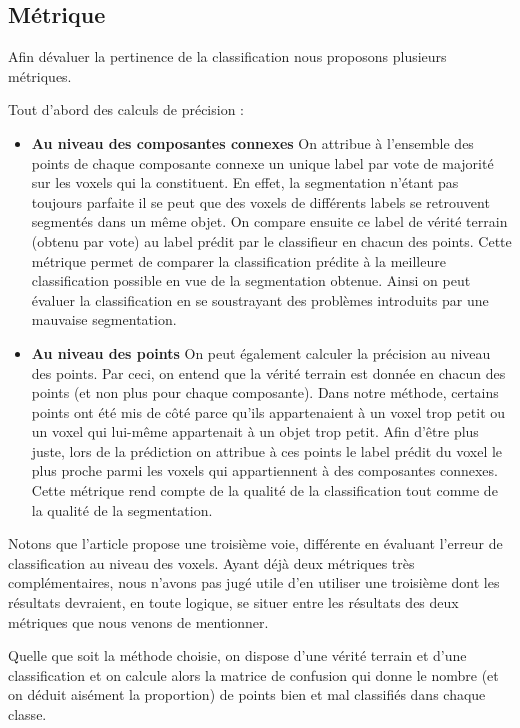 \documentclass[a4paper, onecolumn, 11pt]{article}
\begin{document}
\subsection{Métrique}

Afin dévaluer la pertinence de la classification nous proposons plusieurs métriques.

Tout d'abord des calculs de précision :
\begin{itemize}
\item \textbf{Au niveau des composantes connexes} On attribue à l'ensemble des points de chaque composante connexe un unique label par vote de majorité sur les voxels qui la constituent. En effet, la segmentation n'étant pas toujours parfaite il se peut que des voxels de différents labels se retrouvent segmentés dans un même objet. On compare ensuite ce label de vérité terrain (obtenu par vote) au label prédit par le classifieur en chacun des points. Cette métrique permet de comparer la classification prédite à la meilleure classification possible en vue de la segmentation obtenue. Ainsi on peut évaluer la classification en se soustrayant des problèmes introduits par une mauvaise segmentation.

\item \textbf{Au niveau des points} On peut également calculer la précision au niveau des points. Par ceci, on entend que la vérité terrain est donnée en chacun des points (et non plus pour chaque composante). Dans notre méthode, certains points ont été mis de côté parce qu'ils appartenaient à un voxel trop petit ou un voxel qui lui-même appartenait à un objet trop petit. Afin d'être plus juste, lors de la prédiction on attribue à ces points le label prédit du voxel le plus proche parmi les voxels qui appartiennent à des composantes connexes. Cette métrique rend compte de la qualité de la classification tout comme de la qualité de la segmentation.
\end{itemize}

Notons que l'article \cite{aka_article} propose une troisième voie, différente en évaluant l'erreur de classification au niveau des voxels. Ayant déjà deux métriques très complémentaires, nous n'avons pas jugé utile d'en utiliser une troisième dont les résultats devraient, en toute logique, se situer entre les résultats des deux métriques que nous venons de mentionner.

Quelle que soit la méthode choisie, on dispose d'une vérité terrain et d'une classification et on calcule alors la matrice de confusion qui donne le nombre (et on déduit aisément la proportion) de points bien et mal classifiés dans chaque classe.
\end{document}

